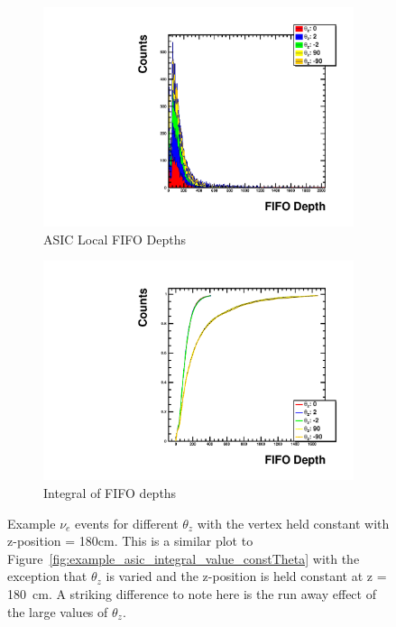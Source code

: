 \begin{figure}
\centering
\begin{subfigure}{.5\textwidth}
  \centering
  \includegraphics[width=\textwidth]{images/Const_Z180_ASIC_stack_integral_pdg12_fhc.pdf}
  \caption{ASIC Local FIFO Depths}
\end{subfigure}%
\begin{subfigure}{.5\textwidth}
  \centering
  \includegraphics[width=\textwidth]{images/Const_Z180_ASIC_integral_pdg12_fhc.pdf}
  \caption{Integral of FIFO depths}
\end{subfigure}
\caption{Example $\nu_{e}$ events for different $\theta_{z}$ with the vertex held constant with z-position = 180cm.
This is a similar plot to Figure~\ref{fig:example_asic_integral_value_constTheta} with the exception that $\theta_{z}$ is varied and the z-position is held constant at z = 180~\unit{cm}.
A striking difference to note here is the run away effect of the large values of $\theta_{z}$.
}
\label{fig:example_asic_integral_value_constZpos}
\end{figure}

